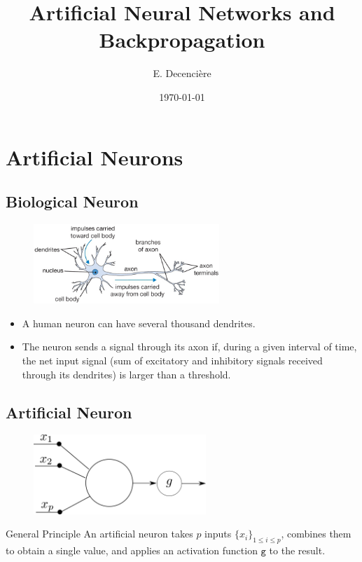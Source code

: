 \documentclass{book}
\title{Artificial Neural Networks and Backpropagation}
\author{E. Decencière}
\date{\today}
\newcommand{\act}{\texttt{g}}%
\begin{document}
\maketitle
\tableofcontents

\chapter{Artificial Neurons}

\section{Biological Neuron}

\begin{figure}[h]
    \centering
    \includegraphics[height=3cm]{neuron}
\end{figure}

\begin{itemize}
\item A human neuron can have several thousand dendrites.
\item The neuron sends a signal through its axon if, during a given interval of time, the net input signal (sum of excitatory and inhibitory signals received through its dendrites) is larger than a threshold.
\end{itemize}

\section{Artificial Neuron}

\begin{figure}[h]
    \centering
    \includegraphics[height=3cm]{neurone_general}
\end{figure}

\begin{block}{General Principle}
An artificial neuron takes $p$ inputs $\{x_i\}_{1 \leq i \leq p}$, combines them to obtain a single value, and applies an activation function $\act$ to the result.
\end{block}
\end{document}

